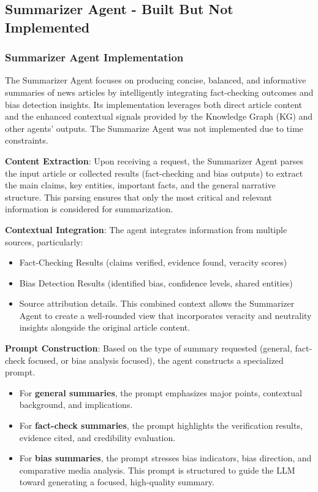 \documentclass{scrartcl}
\begin{document}
\subsection{Summarizer Agent - Built But Not Implemented}
\subsubsection{Summarizer Agent Implementation}
The Summarizer Agent focuses on producing concise, balanced, and informative summaries of news articles by intelligently integrating fact-checking outcomes and bias detection insights. Its implementation leverages both direct article content and the enhanced contextual signals provided by the Knowledge Graph (KG) and other agents’ outputs. The Summarize Agent was not implemented due to time constraints. 

\textbf{Content Extraction}: Upon receiving a request, the Summarizer Agent parses the input article or collected results (fact-checking and bias outputs) to extract the main claims, key entities, important facts, and the general narrative structure. This parsing ensures that only the most critical and relevant information is considered for summarization.

\textbf{Contextual Integration}: The agent integrates information from multiple sources, particularly:
\begin{itemize}
    \item Fact-Checking Results (claims verified, evidence found, veracity scores)
    \item Bias Detection Results (identified bias, confidence levels, shared entities)
    \item Source attribution details. This combined context allows the Summarizer Agent to create a well-rounded view that incorporates veracity and neutrality insights alongside the original article content.

\end{itemize}

\textbf{Prompt Construction}: Based on the type of summary requested (general, fact-check focused, or bias analysis focused), the agent constructs a specialized prompt.
\begin{itemize}
    \item For \textbf{general summaries}, the prompt emphasizes major points, contextual background, and implications.
    \item For \textbf{fact-check summaries}, the prompt highlights the verification results, evidence cited, and credibility evaluation.
    \item For \textbf{bias summaries}, the prompt stresses bias indicators, bias direction, and comparative media analysis. This prompt is structured to guide the LLM toward generating a focused, high-quality summary.

\end{itemize}
\end{document}
